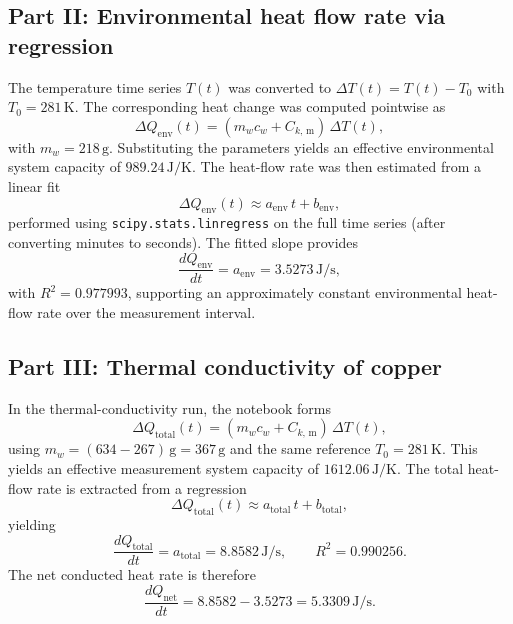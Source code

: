 \documentclass[journal]{IEEEtran}
\begin{document}
\subsection{Part II: Environmental heat flow rate via regression}
The temperature time series $T(t)$ was converted to $\Delta T(t)=T(t)-T_0$ with
$T_0 = 281\,\text{K}$. The corresponding heat change was computed pointwise as
\begin{equation}
    \Delta Q_{\text{env}}(t) = \left(m_w c_w + C_{k,\,\text{m}}\right)\,\Delta T(t),
\end{equation}
with $m_w = 218\,\text{g}$. Substituting the parameters yields an effective environmental system capacity of $989.24\,\text{J/K}$. The heat-flow rate was then estimated from a linear fit
\begin{equation}
    \Delta Q_{\text{env}}(t) \approx a_{\text{env}}\,t + b_{\text{env}},
\end{equation}
performed using \texttt{scipy.stats.linregress} on the full time series (after converting
minutes to seconds). The fitted slope provides
\begin{equation}
    \frac{dQ_{\text{env}}}{dt} = a_{\text{env}} = 3.5273\,\text{J/s},
\end{equation}
with $R^2=0.977993$, supporting an approximately constant environmental heat-flow rate
over the measurement interval.

\subsection{Part III: Thermal conductivity of copper}
In the thermal-conductivity run, the notebook forms
\begin{equation}
    \Delta Q_{\text{total}}(t) = \left(m_w c_w + C_{k,\,\text{m}}\right)\,\Delta T(t),
\end{equation}
using $m_w = (634-267)\,\text{g} = 367\,\text{g}$ and the same reference $T_0=281\,\text{K}$. This yields an effective measurement system capacity of $1612.06\,\text{J/K}$.
The total heat-flow rate is extracted from a regression
\begin{equation}
    \Delta Q_{\text{total}}(t) \approx a_{\text{total}}\,t + b_{\text{total}},
\end{equation}
yielding
\begin{equation}
    \frac{dQ_{\text{total}}}{dt} = a_{\text{total}} = 8.8582\,\text{J/s}, \qquad R^2=0.990256.
\end{equation}
The net conducted heat rate is therefore
\begin{equation}
    \frac{dQ_{\text{net}}}{dt} = 8.8582 - 3.5273 = 5.3309\,\text{J/s}.
\end{equation}
\end{document}

